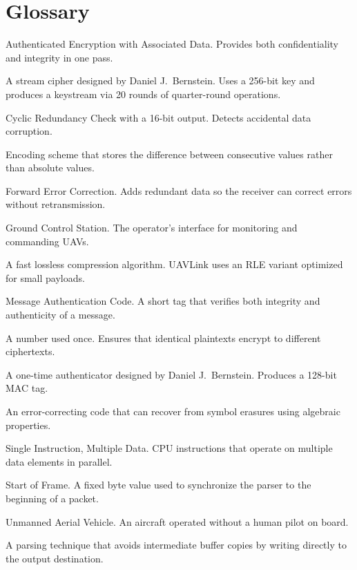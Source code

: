\documentclass[11pt,a4paper]{article}
\begin{document}
\section{Glossary}

\begin{description}[style=nextline]
    \item[AEAD] Authenticated Encryption with Associated Data. Provides both confidentiality and integrity in one pass.
    \item[ChaCha20] A stream cipher designed by Daniel J.\ Bernstein. Uses a 256-bit key and produces a keystream via 20 rounds of quarter-round operations.
    \item[CRC-16] Cyclic Redundancy Check with a 16-bit output. Detects accidental data corruption.
    \item[Delta Encoding] Encoding scheme that stores the difference between consecutive values rather than absolute values.
    \item[FEC] Forward Error Correction. Adds redundant data so the receiver can correct errors without retransmission.
    \item[GCS] Ground Control Station. The operator's interface for monitoring and commanding UAVs.
    \item[LZ4] A fast lossless compression algorithm. UAVLink uses an RLE variant optimized for small payloads.
    \item[MAC] Message Authentication Code. A short tag that verifies both integrity and authenticity of a message.
    \item[Nonce] A number used once. Ensures that identical plaintexts encrypt to different ciphertexts.
    \item[Poly1305] A one-time authenticator designed by Daniel J.\ Bernstein. Produces a 128-bit MAC tag.
    \item[Reed-Solomon] An error-correcting code that can recover from symbol erasures using algebraic properties.
    \item[SIMD] Single Instruction, Multiple Data. CPU instructions that operate on multiple data elements in parallel.
    \item[SOF] Start of Frame. A fixed byte value used to synchronize the parser to the beginning of a packet.
    \item[UAV] Unmanned Aerial Vehicle. An aircraft operated without a human pilot on board.
    \item[Zero-Copy] A parsing technique that avoids intermediate buffer copies by writing directly to the output destination.
\end{description}
\end{document}
